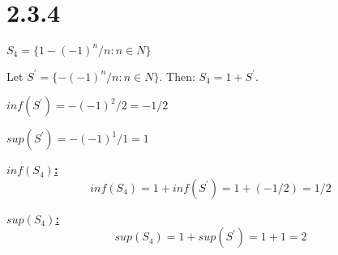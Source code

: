 \documentclass{article}
\begin{document}
\section*{2.3.4}
$S_4 = \{1-(-1)^n/n: n \in N\}$
\newline

\noindent
Let $S^\prime= \{-(-1)^n/n: n \in N\}$. Then: $S_4 = 1 + S^\prime $.
\newline

\noindent
$inf(S^\prime) = -(-1)^2/2 = -1/2$
\newline

\noindent
$sup(S^\prime) = -(-1)^1/1 = 1$
\newline

\noindent
\textbf{\underline{$inf(S_4)$:}}
\begin{equation*}
  inf(S_4) = 1 + inf(S^\prime) = 1 + (-1/2) = 1/2
\end{equation*}
\newline

\noindent
\textbf{\underline{$sup(S_4)$:}} 
\begin{equation*}
  sup(S_4) = 1 + sup(S^\prime) = 1 + 1 = 2
\end{equation*}
\end{document}
